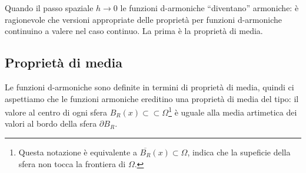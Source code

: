 \documentclass[10pt,a4paper,twoside,openright]{book}
\begin{document}
Quando il passo spaziale $\displaystyle h\rightarrow 0$ le funzioni d-armoniche ``diventano'' armoniche: è ragionevole che versioni appropriate delle proprietà per funzioni d-armoniche continuino a valere nel caso continuo. La prima è la proprietà di media.
\subsection{Proprietà di media}

Le funzioni d-armoniche sono definite in termini di proprietà di media, quindi ci aspettiamo che le funzioni armoniche ereditino una proprietà di media del tipo: il valore al centro di ogni sfera $\displaystyle B_{R}(x) \subset \subset \Omega $\footnote{Questa notazione è equivalente a $\displaystyle \overline{B_{R}}(x) \subset \Omega $, indica che la supeficie della sfera non tocca la frontiera di $\displaystyle \Omega $.} è uguale alla media artimetica dei valori al bordo della sfera $\displaystyle \partial B_{R}$.
\end{document}

